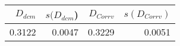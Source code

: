 \begin{tabular}{rrrr}
\toprule
$D_{dcm}$ & $s(D_{dcm}$) & $D_{Corrv}$ & $s(D_{Corrv})$ \\
\midrule
0.3122 & 0.0047 & 0.3229 & 0.0051 \\
\bottomrule
\end{tabular}
